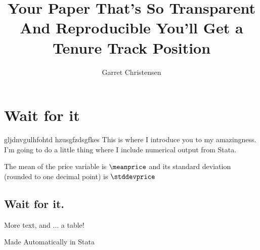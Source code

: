 \documentclass[11pt]{article} %
\title{Your Paper That's So Transparent And Reproducible You'll Get a Tenure Track Position}
\author{Garret Christensen}
\begin{document}

\maketitle

\section{Wait for it}
gljdnvgulhfohtd
hzusgfzdsgfkes
This is where I introduce you to my amazingness.
I'm going to do a little thing where I include numerical output from Stata.

The mean of the price variable is $\meanprice$ and its standard deviation (rounded to one decimal point) is $\stddevprice$

\subsection{Wait for it.}

More text, and ... a table! 

\begin{table}
\caption{Made Automatically in Stata}
\end{table}

\end{document}
